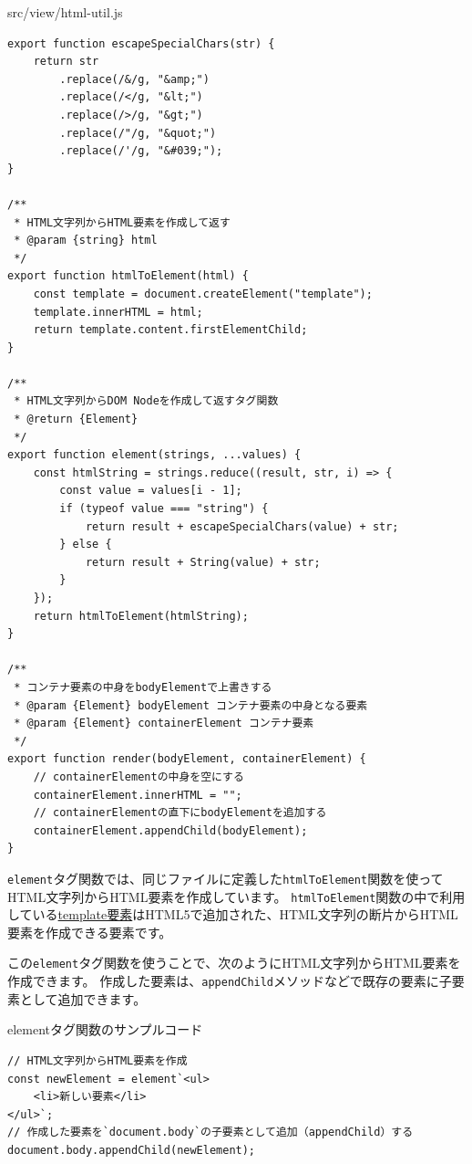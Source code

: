 \begin{listtitle}
src/view/html-util.js
\end{listtitle}
\begin{lstlisting}
export function escapeSpecialChars(str) {
    return str
        .replace(/&/g, "&amp;")
        .replace(/</g, "&lt;")
        .replace(/>/g, "&gt;")
        .replace(/"/g, "&quot;")
        .replace(/'/g, "&#039;");
}

/**
 * HTML文字列からHTML要素を作成して返す
 * @param {string} html 
 */
export function htmlToElement(html) {
    const template = document.createElement("template");
    template.innerHTML = html;
    return template.content.firstElementChild;
}

/**
 * HTML文字列からDOM Nodeを作成して返すタグ関数
 * @return {Element}
 */
export function element(strings, ...values) {
    const htmlString = strings.reduce((result, str, i) => {
        const value = values[i - 1];
        if (typeof value === "string") {
            return result + escapeSpecialChars(value) + str;
        } else {
            return result + String(value) + str;
        }
    });
    return htmlToElement(htmlString);
}

/**
 * コンテナ要素の中身をbodyElementで上書きする
 * @param {Element} bodyElement コンテナ要素の中身となる要素
 * @param {Element} containerElement コンテナ要素
 */
export function render(bodyElement, containerElement) {
    // containerElementの中身を空にする
    containerElement.innerHTML = "";
    // containerElementの直下にbodyElementを追加する
    containerElement.appendChild(bodyElement);
}
\end{lstlisting}
\listend

\texttt{element}タグ関数では、同じファイルに定義した\texttt{htmlToElement}関数を使ってHTML文字列からHTML要素を作成しています。
\texttt{htmlToElement}関数の中で利用している\href{https://developer.mozilla.org/ja/docs/Web/HTML/Element/template}{template要素}はHTML5で追加された、HTML文字列の断片からHTML要素を作成できる要素です。

この\texttt{element}タグ関数を使うことで、次のようにHTML文字列からHTML要素を作成できます。
作成した要素は、\texttt{appendChild}メソッドなどで既存の要素に子要素として追加できます。

\begin{listtitle}
elementタグ関数のサンプルコード
\end{listtitle}
\begin{lstlisting}
// HTML文字列からHTML要素を作成
const newElement = element`<ul>
    <li>新しい要素</li>
</ul>`;
// 作成した要素を`document.body`の子要素として追加（appendChild）する
document.body.appendChild(newElement);
\end{lstlisting}
\listend

